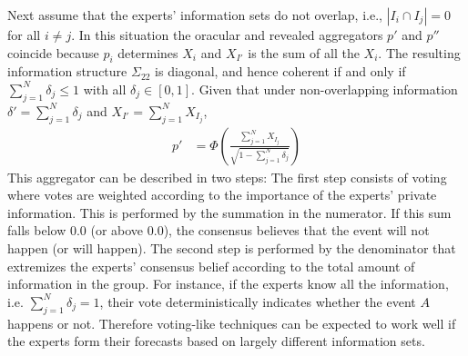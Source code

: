\documentclass[11pt]{article}
\theoremstyle{definition}
\theoremstyle{definition}
\begin{document}
Next assume that the experts' information sets do not overlap, 
i.e., $|I_{i} \cap I_{j}| = 0$ for all $i \neq j$. 
In this situation the oracular and revealed aggregators $p'$ and $p''$
coincide because $p_i$ determines $X_i$ and $X_{I'}$ is the sum of
all the $X_i$.  The resulting information structure $\Sigma_{22}$ 
is diagonal, and hence coherent if and only if $\sum_{j=1}^N \delta_j \leq 1$ 
with all $\delta_j \in [0,1]$.  Given that under non-overlapping information 
$\delta' = \sum_{j=1}^N \delta_j$ and $X_{I'} = \sum_{j=1}^N X_{I_j}$, 
 \begin{align}
p' &= \Phi\left( \frac{\sum_{j=1}^N X_{I_j}}
  {\sqrt{1- \sum_{j=1}^N \delta_j}} \right) \label{vote}
\end{align}
This aggregator can be described in two steps: The first step consists of voting where votes are weighted according to the importance of the experts' private information. This is performed by the summation in the numerator. If this sum falls below $0.0$ (or above $0.0$), the consensus believes that the event will not happen (or will happen). The second step is performed by the denominator that extremizes the experts'  consensus belief according to the total amount of information in the group. For instance, if the experts know all the information, i.e. $\sum_{j=1}^N \delta_j = 1$, their vote deterministically indicates whether the event $A$ happens or not.  Therefore voting-like techniques can be expected to work well if the experts form their forecasts based on largely different information sets. 
\end{document}
